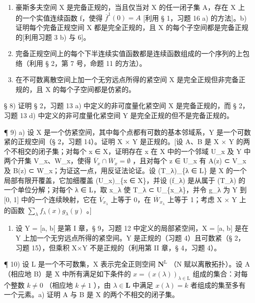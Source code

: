 \begin{enumerate}
\def\labelenumi{\alph{enumi})}
\item
  豪斯多夫空间 X 是完备正规的，当且仅当对 X 的任一闭子集 A，存在 X 上的一个实值连续函数 f，使得 \(\overline{f}^{1}(0)=A\) {[}利用 § 1，习题 16 a) 的方法{]}。b) 证明每个完备正规空间 X 都是完全正规的，且 X 的每个子空间都是完备正规的{[}利用习题 3 b) 与 6{]}。
\item
  完备正规空间上的每个下半连续实值函数都是连续函数组成的一个序列的上包络（利用 § 2，第 7 号，命题 11 的方法）。
\item
  在不可数离散空间上加一个无穷远点所得的紧空间 X 是完全正规但非完备正规的，且 X 的每个子空间都是仿紧的。
\end{enumerate}

§ 8) 证明 § 2，习题 13 a) 中定义的非可度量化紧空间 X 是完备正规的，而 § 2，习题 13 d) 中定义的非可度量化紧空间 Y 是完全正规的但不是完备正规的。

¶ 9) a) 设 X 是一个仿紧空间，其中每个点都有可数的基本邻域系，Y 是一个可数紧的正规空间（§ 2，习题 14）。证明 X × Y 是正规的。{[}设 A、B 是 X × Y 的两个不相交的闭子集；对每个 x ∈ X，证明存在 x 在 X 中的一个邻域 U\_x 及 Y 中两个开集 V\_x、W\_x，使得 \(\overline{V}_x \cap \overline{W}_x = \emptyset\) ，且对每个 z ∈ U\_x 有 A(z) ⊂ V\_x 及 B(z) ⊂ W\_x；为证这一点，用反证法论证。设 (T\_λ)\_\{λ ∈ L\} 是 X 的一个局部有限开覆盖，它加细覆盖 (U\_x)\_\{x ∈ X\}，并设 (f\_λ) 是从属于 (T\_λ) 的一个单位分解；对每个 λ ∈ L，取 x\_λ 使 T\_λ ⊂ U\_\{x\_λ\}，并令 g\_λ 为 Y 到 {[}0, 1{]} 中的一个连续映射，它在 \(\overline{V}_{x_λ}\) 上等于 0，在 \(\overline{W}_{x_λ}\) 上等于 1；考虑 X × Y 上的函数 \(\sum_{\lambda} f_\lambda(x) g_\lambda(y)\) 。{]}

\begin{enumerate}
\def\labelenumi{\alph{enumi})}
\setcounter{enumi}{1}
\tightlist
\item
  设 Y = {[}a, b{[} 是第 I 章，§ 9，习题 12 中定义的局部紧空间，X = {[}a, b{]} 是在 Y 上加一个无穷远点所得的紧空间。Y 是正规的（习题 4）且可数紧（§ 2，习题 15），但乘积 X×Y 不是正规的（利用第 II 章，§ 4，习题 4）。
\end{enumerate}

¶ 10) 设 L 是一个不可数集，X 表示完全正则空间 \(\mathbf{N}^{\mathrm{L}}\) （N 赋以离散拓扑）。设 A（相应地 B）是 X 中所有满足如下条件的 \(x = (x(\lambda))_{\lambda \in \mathrm{L}}\) 组成的集合：对每个整数 \(k \neq 0\) （相应地 \(k \neq 1\) ），由 \(\lambda \in \mathbf{L}\) 中满足 \(x(\lambda) = k\) 者组成的集至多有一个元素。a) 证明 A 与 B 是 X 的两个不相交的闭子集。

